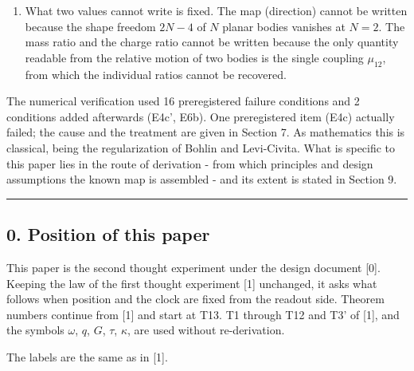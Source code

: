 \documentclass[
  a4paper,
]{article}
\begin{document}
\begin{enumerate}
  be represented. The map \(z=w^2\) and the clock \(dt\propto r\,ds\)
  have the same form as the Levi-Civita regularization, but the
  collision orbits that regularization treats lie outside this model.
\item
  What two values cannot write is fixed. The map (direction) cannot be
  written because the shape freedom \(2N-4\) of \(N\) planar bodies
  vanishes at \(N=2\). The mass ratio and the charge ratio cannot be
  written because the only quantity readable from the relative motion of
  two bodies is the single coupling \(\mu_{12}\), from which the
  individual ratios cannot be recovered.
\end{enumerate}

The numerical verification used 16 preregistered failure conditions and
2 conditions added afterwards (E4c', E6b). One preregistered item (E4c)
actually failed; the cause and the treatment are given in Section 7. As
mathematics this is classical, being the regularization of Bohlin and
Levi-Civita. What is specific to this paper lies in the route of
derivation - from which principles and design assumptions the known map
is assembled - and its extent is stated in Section 9.

\begin{center}\rule{0.5\linewidth}{0.5pt}\end{center}

\subsection{0. Position of this paper}\label{position-of-this-paper}

This paper is the second thought experiment under the design document
{[}0{]}. Keeping the law of the first thought experiment {[}1{]}
unchanged, it asks what follows when position and the clock are fixed
from the readout side. Theorem numbers continue from {[}1{]} and start
at T13. T1 through T12 and T3' of {[}1{]}, and the symbols \(\omega\),
\(q\), \(G\), \(\tau\), \(\kappa\), are used without re-derivation.

The labels are the same as in {[}1{]}.
\end{document}
